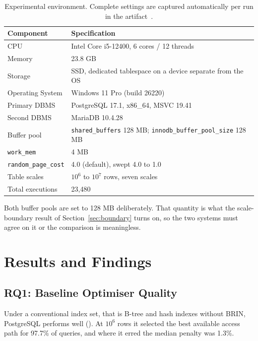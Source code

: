\documentclass[12pt, a4paper]{article}
\newcommand{\rpc}{\texttt{random\_page\_cost}}
\newcommand{\sbuf}{\texttt{shared\_buffers}}
\begin{document}
\begin{table}[htbp]
\centering
\caption{Experimental environment. Complete settings are captured
automatically per run in the artifact~\cite{artifact2026}.}
\label{tab:setup}
\small
\begin{tabular}{@{}ll@{}}
\toprule
\textbf{Component} & \textbf{Specification} \\
\midrule
CPU & Intel Core i5-12400, 6 cores / 12 threads \\
Memory & 23.8 GB \\
Storage & SSD, dedicated tablespace on a device separate from the OS \\
Operating System & Windows 11 Pro (build 26220) \\
Primary DBMS & PostgreSQL 17.1, x86\_64, MSVC 19.41 \\
Second DBMS & MariaDB 10.4.28 \\
Buffer pool & \sbuf{} 128 MB; \texttt{innodb\_buffer\_pool\_size} 128 MB \\
\texttt{work\_mem} & 4 MB \\
\rpc{} & 4.0 (default), swept 4.0 to 1.0 \\
Table scales & $10^6$ to $10^7$ rows, seven scales \\
Total executions & 23{,}480 \\
\bottomrule
\end{tabular}
\end{table}

Both buffer pools are set to 128 MB deliberately. That quantity is what
the scale-boundary result of Section~\ref{sec:boundary} turns on, so the
two systems must agree on it or the comparison is meaningless.

\section{Results and Findings}
\label{sec:results}

\subsection{RQ1: Baseline Optimiser Quality}
\label{sec:baseline}

Under a conventional index set, that is B-tree and hash indexes without
BRIN, PostgreSQL performs well (). At $10^6$ rows it
selected the best available access path for 97.7\% of queries, and where
it erred the median penalty was 1.3\%.
\end{document}
